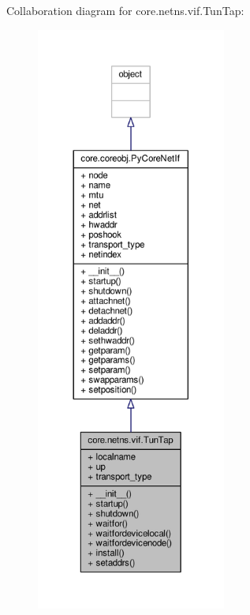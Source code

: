 Collaboration diagram for core.\+netns.\+vif.\+Tun\+Tap\+:
\nopagebreak
\begin{figure}[H]
\begin{center}
\leavevmode
\includegraphics[height=550pt]{classcore_1_1netns_1_1vif_1_1_tun_tap__coll__graph}
\end{center}
\end{figure}
